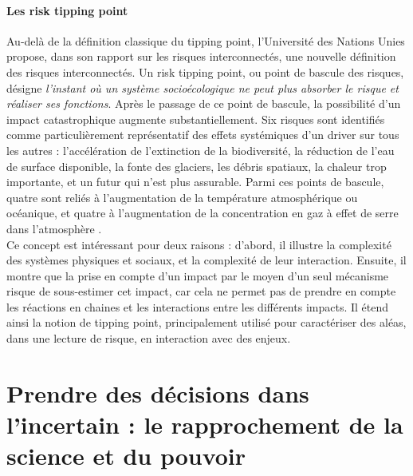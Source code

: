 \paragraph{Les \gls{risk tipping point}}

Au-delà de la définition classique du tipping point, l'Université des Nations Unies propose, dans son rapport sur les risques interconnectés, une nouvelle définition des risques interconnectés. Un \gls{risk tipping point}, ou point de bascule des risques, désigne \textit{l'instant où un système socioécologique ne peut plus absorber le risque et réaliser ses fonctions}. Après le passage de ce point de bascule, la possibilité d'un impact catastrophique augmente substantiellement. Six risques sont identifiés comme particulièrement représentatif des effets systémiques d'un driver sur tous les autres : l'accélération de l'extinction de la biodiversité, la réduction de l'eau de surface disponible, la fonte des glaciers, les débris spatiaux, la chaleur trop importante, et un futur qui n'est plus assurable. Parmi ces points de bascule, quatre sont  reliés à l'augmentation de la température atmosphérique ou océanique, et quatre à l'augmentation de la concentration en gaz à effet de serre dans l'atmosphère \autocite{united_nations_university_-_institute_for_environment_and_human_security_unu-ehs_interconnected_2023}. \\

Ce concept est intéressant pour deux raisons : d'abord, il illustre la complexité des systèmes physiques et sociaux, et la complexité de leur interaction. Ensuite, il montre que la prise en compte d'un impact par le moyen d'un seul mécanisme risque de sous-estimer cet impact, car cela ne permet pas de prendre en compte les réactions en chaines et les interactions entre les différents impacts. Il étend ainsi la notion de tipping point, principalement utilisé pour caractériser des aléas, dans une lecture de risque, en interaction avec des enjeux. 

\section{Prendre des décisions dans l'incertain : le rapprochement de la science et du pouvoir}
\label{sect/1/2}

